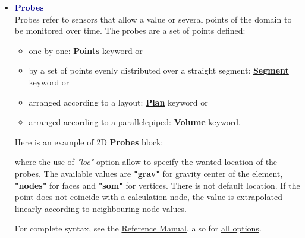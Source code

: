 \begin{itemize}
\item \textcolor{darkblue}{\textbf{Probes}}\\
Probes refer to sensors that allow a value or several points of the domain to be monitored over time.
The probes are a set of points defined:
\begin{itemize}
\item one by one: \href{\REFERENCEMANUAL\#points}{\textbf{Points}} keyword or 
\item by a set of points evenly distributed over a straight segment: \href{\REFERENCEMANUAL\#segment}{\textbf{Segment}} keyword or
\item arranged according to a layout: \href{\REFERENCEMANUAL\#plan}{\textbf{Plan}} keyword or
\item arranged according to a parallelepiped: \href{\REFERENCEMANUAL\#volume}{\textbf{Volume}} keyword.
\end{itemize}

Here is an example of 2D \textbf{Probes} block:
    \begin{center}
    \end{center}
where the use of \textit{"loc"} option allow to specify the wanted location of the probes. The available values are \textbf{"grav"} for gravity center of the element, \textbf{"nodes"} for faces and \textbf{"som"} for vertices. There is not default location. If the point does not coincide with a calculation node, the value is extrapolated linearly according to neighbouring node values.

For complete syntax, see the \href{\REFERENCEMANUAL\#corpspostraitement}{\trustref Reference Manual}, also for \href{\REFERENCEMANUAL\#sondes}{all options}.


\end{itemize}
